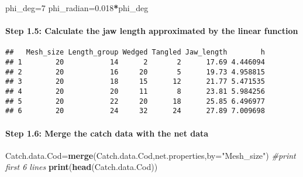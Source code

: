 \documentclass[]{article}
\newenvironment{Shaded}{\begin{snugshade}}{\end{snugshade}}
\newcommand{\KeywordTok}[1]{\textcolor[rgb]{0.13,0.29,0.53}{\textbf{#1}}}
\newcommand{\DataTypeTok}[1]{\textcolor[rgb]{0.13,0.29,0.53}{#1}}
\newcommand{\DecValTok}[1]{\textcolor[rgb]{0.00,0.00,0.81}{#1}}
\newcommand{\FloatTok}[1]{\textcolor[rgb]{0.00,0.00,0.81}{#1}}
\newcommand{\StringTok}[1]{\textcolor[rgb]{0.31,0.60,0.02}{#1}}
\newcommand{\CommentTok}[1]{\textcolor[rgb]{0.56,0.35,0.01}{\textit{#1}}}
\newcommand{\OperatorTok}[1]{\textcolor[rgb]{0.81,0.36,0.00}{\textbf{#1}}}
\newcommand{\NormalTok}[1]{#1}
\let\oldparagraph\paragraph
\renewcommand{\paragraph}[1]{\oldparagraph{#1}\mbox{}}
\begin{document}
\begin{Shaded}
\begin{Highlighting}[]
\NormalTok{phi_deg=}\DecValTok{7}
\NormalTok{phi_radian=}\FloatTok{0.018}\OperatorTok{*}\NormalTok{phi_deg}
\end{Highlighting}
\end{Shaded}

\paragraph{Step 1.5: Calculate the jaw length approximated by the linear
function}\label{step-1.5-calculate-the-jaw-length-approximated-by-the-linear-function}

\begin{Shaded}
\end{Shaded}

\begin{verbatim}
##   Mesh_size Length_group Wedged Tangled Jaw_length        h
## 1        20           14      2       2      17.69 4.446094
## 2        20           16     20       5      19.73 4.958815
## 3        20           18     15      12      21.77 5.471535
## 4        20           20     11       8      23.81 5.984256
## 5        20           22     20      18      25.85 6.496977
## 6        20           24     32      24      27.89 7.009698
\end{verbatim}

\paragraph{Step 1.6: Merge the catch data with the net
data}\label{step-1.6-merge-the-catch-data-with-the-net-data}

\begin{Shaded}
\begin{Highlighting}[]
\NormalTok{Catch.data.Cod=}\KeywordTok{merge}\NormalTok{(Catch.data.Cod,net.properties,}\DataTypeTok{by=}\StringTok{"Mesh_size"}\NormalTok{)}
\CommentTok{#print first 6 lines}
\KeywordTok{print}\NormalTok{(}\KeywordTok{head}\NormalTok{(Catch.data.Cod))}
\end{Highlighting}
\end{Shaded}
\end{document}
